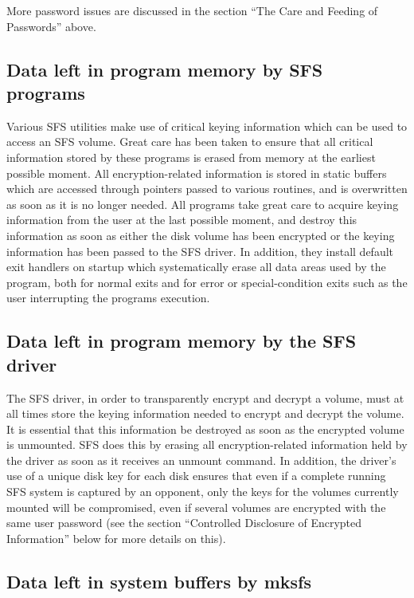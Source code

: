 More password issues are discussed in the section ``The Care and Feeding of
Passwords'' above.


\subsection{Data left in program memory by SFS programs}

Various SFS utilities make use of critical keying information which can be used
to access an SFS volume.  Great care has been taken to ensure that all critical
information stored by these programs is erased from memory at the earliest
possible moment.  All encryption-related information is stored in static
buffers which are accessed through pointers passed to various routines, and is
overwritten as soon as it is no longer needed.  All programs take great care to
acquire keying information from the user at the last possible moment, and
destroy this information as soon as either the disk volume has been encrypted
or the keying information has been passed to the SFS driver.  In addition, they
install default exit handlers on startup which systematically erase all data
areas used by the program, both for normal exits and for error or
special-condition exits such as the user interrupting the programs execution.


\subsection{Data left in program memory by the SFS driver}

The SFS driver, in order to transparently encrypt and decrypt a volume, must
at all times store the keying information needed to encrypt and decrypt the
volume.  It is essential that this information be destroyed as soon as the
encrypted volume is unmounted.  SFS does this by erasing all encryption-related
information held by the driver as soon as it receives an unmount command.  In
addition, the driver's use of a unique disk key for each disk ensures that even
if a complete running SFS system is captured by an opponent, only the keys for
the volumes currently mounted will be compromised, even if several volumes are
encrypted with the same user password (see the section ``Controlled Disclosure
of Encrypted Information'' below for more details on this).


\subsection{Data left in system buffers by mksfs}

